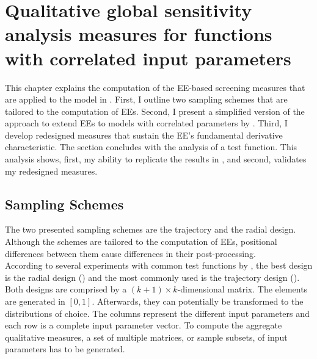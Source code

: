 
\section{Qualitative global sensitivity analysis measures for functions with correlated input parameters}
\thispagestyle{plain} %

This chapter explains the computation of the EE-based screening measures that are applied to the model in \cite{Keane.1994}.
First, I outline two sampling schemes that are tailored to the computation of EEs. Second, I present a simplified version of the approach to extend EEs to models with correlated parameters by \cite{ge2017extending}. Third, I develop redesigned measures that sustain the EE's fundamental derivative characteristic. The section concludes with the analysis of a test function. This analysis shows, first, my ability to replicate the results in \cite{ge2017extending}, and second, validates my redesigned measures.


\subsection{Sampling Schemes}

The two presented sampling schemes are the trajectory and the radial design. Although the schemes are tailored to the computation of EEs, positional differences between them cause differences in their post-processing.\\

\noindent
According to several experiments with common test functions by \cite{campolongo2011screening}, the best design is the radial design (\cite{saltelli2002making}) and the most commonly used is the trajectory design (\cite{Morris.1991}).
Both designs are comprised by a $(k + 1) \times k$-dimensional matrix. The elements are generated in $[0,1]$. Afterwards, they can potentially be transformed to the distributions of choice. The columns represent the different input parameters and each row is a complete input parameter vector. To compute the aggregate qualitative measures, a set of multiple matrices, or sample subsets, of input parameters has to be generated.\\

